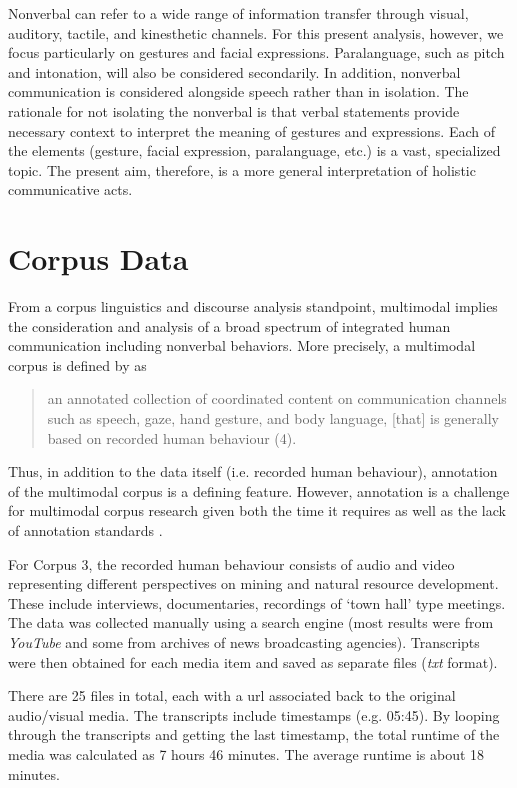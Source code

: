Nonverbal can refer to a wide range of information transfer through visual, auditory, tactile, and kinesthetic channels. For this present analysis, however, we focus particularly on gestures and facial expressions. Paralanguage, such as pitch and intonation, will also be considered secondarily. In addition, nonverbal communication is considered alongside speech rather than in isolation. The rationale for not isolating the nonverbal is that verbal statements provide necessary context to interpret the meaning of gestures and expressions. Each of the elements (gesture, facial expression, paralanguage, etc.) is a vast, specialized topic. The present aim, therefore, is a more general interpretation of holistic communicative acts.

\section{Corpus Data}

From a corpus linguistics and discourse analysis standpoint, multimodal implies the consideration and analysis of a broad spectrum of integrated human communication including nonverbal behaviors. More precisely, a multimodal corpus is defined by \cite*{Foster2008} as

\begin{quote}
an annotated collection of coordinated content on communication channels such as speech,
gaze, hand gesture, and body language, [that] is generally based on recorded
human behaviour (4).
\end{quote}

Thus, in addition to the data itself (i.e. recorded human behaviour), annotation of the multimodal corpus is a defining feature. However, annotation is a challenge for multimodal corpus research given both the time it requires as well as the lack of annotation standards \citep{Abuczki2013}.

For Corpus 3, the recorded human behaviour consists of audio and video representing different perspectives on mining and natural resource development. These include interviews, documentaries, recordings of `town hall' type meetings. The data was collected manually using a search engine (most results were from \textit{YouTube} and some from archives of news broadcasting agencies). Transcripts were then obtained for each media item and saved as separate files (\textit{txt} format).

There are 25 files in total, each with a url associated back to the original audio/visual media. The transcripts include timestamps (e.g. 05:45). By looping through the transcripts and getting the last timestamp, the total runtime of the media was calculated as 7 hours 46 minutes. The average runtime is about 18 minutes.

